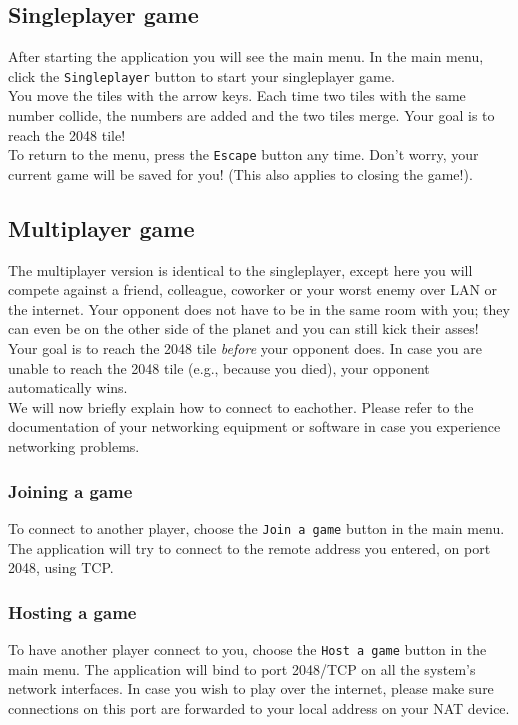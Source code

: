 \documentclass[a4paper,11pt,report]{scrartcl}
\begin{document}
\subsection{Singleplayer game}
After starting the application you will see the main menu. In the main menu,
click the \texttt{Singleplayer} button to start your singleplayer game.\\

You move the tiles with the arrow keys. Each time two tiles with the same
number collide, the numbers are added and the two tiles merge. Your goal is to
reach the 2048 tile!\\

To return to the menu, press the \texttt{Escape} button any time. Don't worry,
your current game will be saved for you! (This also applies to closing the
game!).

\subsection{Multiplayer game}
The multiplayer version is identical to the singleplayer, except here you will
compete against a friend, colleague, coworker or your worst enemy over LAN or
the internet. Your opponent does not have to be in the same room with you; they
can even be on the other side of the planet and you can still kick their
asses!\\

Your goal is to reach the 2048 tile \textit{before} your opponent does. In case you
are unable to reach the 2048 tile (e.g., because you died), your opponent
automatically wins.\\

We will now briefly explain how to connect to eachother. Please refer to the
documentation of your networking equipment or software in case you experience
networking problems.

\subsubsection{Joining a game}
To connect to another player, choose the \texttt{Join a game} button in the
main menu. The application will try to connect to the remote address you
entered, on port 2048, using TCP.

\subsubsection{Hosting a game}
To have another player connect to you, choose the \texttt{Host a game} button
in the main menu. The application will bind to port 2048/TCP on all the
system's network interfaces. In case you wish to play over the internet,
please make sure connections on this port are forwarded to your local address
on your NAT device.
\end{document}
